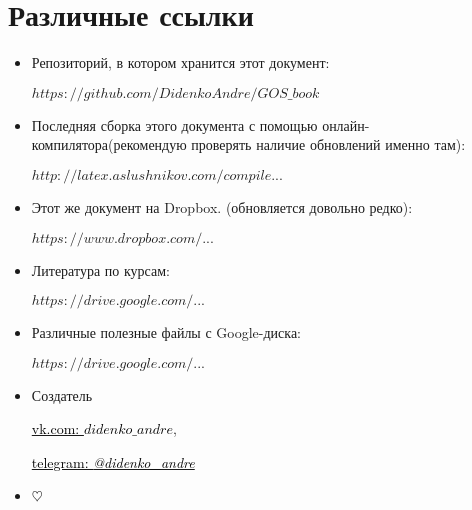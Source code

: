 {\let\clearpage\relax\chapter{Различные ссылки}}
\begin{itemize}
\item

Репозиторий, в котором хранится этот документ:

\href{https://github.com/DidenkoAndre/GOS_book}{$https://github.com/DidenkoAndre/GOS\_book$}

\item
Последняя сборка этого документа с помощью онлайн-компилятора\newline (рекомендую проверять наличие обновлений именно там): 

\href{http://latex.aslushnikov.com/compile?git=https://github.com/DidenkoAndre/GOS_book&target=_main.tex}{$http://latex.aslushnikov.com/compile...$}

\item

Этот же документ на Dropbox.  \newline (обновляется довольно редко):

\href{https://www.dropbox.com/sh/7e5mfj8q68o2ipp/AAD8XvpZhiJzFbEh_IeH305ia?dl=0&preview=GOSBook.pdf}{$https://www.dropbox.com/...$}

\item
Литература по курсам:

\href{https://drive.google.com/drive/u/0/folders/0BzuzEyNkpwYDcENXcV9jNWdwVlU}{$https://drive.google.com/...$}

\item
Различные полезные файлы с Google-диска:

\href{https://drive.google.com/drive/u/0/folders/0BzuzEyNkpwYDYjVNcE0wa3hqWjA}{$https://drive.google.com/...$}

\item
Создатель

\href{https://vk.com/didenko_andre}{\textcolor{black}{vk.com: \textcolor{Purplemountainmajesty}{$didenko\_andre$}}},

\href{https://telegram.me/didenko_andre}{\textcolor{black}{telegram: \textcolor{Purplemountainmajesty}{\textit{@didenko_andre}}}}

\item

$\heartsuit$
\end{itemize}

